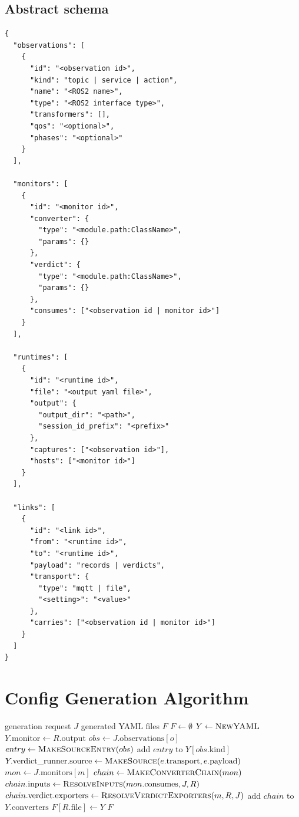 \documentclass[11pt]{article}
\begin{document}
\subsection{Abstract schema}

\begin{verbatim}
{
  "observations": [
    {
      "id": "<observation id>",
      "kind": "topic | service | action",
      "name": "<ROS2 name>",
      "type": "<ROS2 interface type>",
      "transformers": [],
      "qos": "<optional>",
      "phases": "<optional>"
    }
  ],

  "monitors": [
    {
      "id": "<monitor id>",
      "converter": {
        "type": "<module.path:ClassName>",
        "params": {}
      },
      "verdict": {
        "type": "<module.path:ClassName>",
        "params": {}
      },
      "consumes": ["<observation id | monitor id>"]
    }
  ],

  "runtimes": [
    {
      "id": "<runtime id>",
      "file": "<output yaml file>",
      "output": {
        "output_dir": "<path>",
        "session_id_prefix": "<prefix>"
      },
      "captures": ["<observation id>"],
      "hosts": ["<monitor id>"]
    }
  ],

  "links": [
    {
      "id": "<link id>",
      "from": "<runtime id>",
      "to": "<runtime id>",
      "payload": "records | verdicts",
      "transport": {
        "type": "mqtt | file",
        "<setting>": "<value>"
      },
      "carries": ["<observation id | monitor id>"]
    }
  ]
}
\end{verbatim}

\clearpage
\section{Config Generation Algorithm}

\begin{algorithm}[H]
\caption{Generate runtime YAML from JSON}
\begin{algorithmic}[1]
\Require generation request $J$
\Ensure generated YAML files $F$
\State $F \gets \emptyset$
  \State $Y \gets \Call{NewYAML}{}$
  \State $Y.\text{monitor} \gets R.\text{output}$
    \State $obs \gets J.\text{observations}[o]$
    \State $entry \gets \Call{MakeSourceEntry}{obs}$
    \State add $entry$ to $Y[obs.\text{kind}]$
  \EndFor
    \State $Y.\text{verdict\_runner.source} \gets \Call{MakeSource}{e.\text{transport},e.\text{payload}}$
  \EndFor
    \State $mon \gets J.\text{monitors}[m]$
    \State $chain \gets \Call{MakeConverterChain}{mon}$
    \State $chain.\text{inputs} \gets \Call{ResolveInputs}{mon.\text{consumes},J,R}$
    \State $chain.\text{verdict.exporters} \gets \Call{ResolveVerdictExporters}{m,R,J}$
    \State add $chain$ to $Y.\text{converters}$
  \EndFor
    \State {}
  \EndFor
  \State $F[R.\text{file}] \gets Y$
\EndFor
\State {}
\State \Return $F$
\end{algorithmic}
\end{algorithm}
\end{document}
